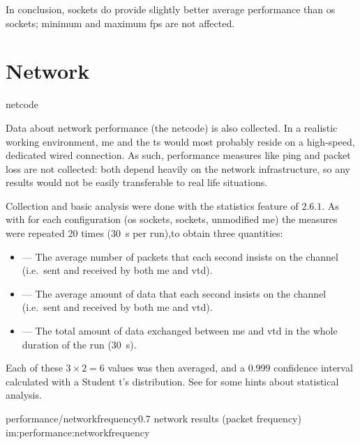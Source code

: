 In conclusion,  sockets do provide slightly better average performance than \gls{os} sockets; minimum and maximum \gls{fps} are not affected.

\section{Network}\label{sc:performance:network}

\begin{definition}{netcode}
\end{definition}



Data about network performance (the \gls{netcode}) is also collected. In a realistic working environment, \gls{me} and the \gls{ts} would most probably reside on a high-speed, dedicated wired connection. As such, performance measures like ping and packet loss are not collected: both depend heavily on the network infrastructure, so any results would not be easily transferable to real life situations.

Collection and basic analysis were done with the statistics feature of  $2.6.1$. As with  for each configuration (\gls{os} sockets,  sockets, unmodified \gls{me}) the measures were repeated \num{20} times (\SI{30}{\second} per run),to obtain three quantities:

\begin{itemize}
	\item {} --- The average number of packets that each second insists on the channel (i.e.\ sent and received by both \gls{me} and \gls{vtd}).
	\item {} --- The average amount of data that each second insists on the channel (i.e.\ sent and received by both \gls{me} and \gls{vtd}).
	\item {} --- The total amount of data exchanged between \gls{me} and \gls{vtd} in the whole duration of the run (\SI{30}{\second}).
\end{itemize}

\FLOATnoindent Each of these $3\times2=6$ values was then averaged, and a \num{0,999} confidence interval calculated with a Student t's distribution. See  for some hints about statistical analysis.

\begin{image}
	{performance/networkfrequency}{0.7}
	{network results (packet frequency)}
	{im:performance:networkfrequency}
	{}
	{}
\end{image}

